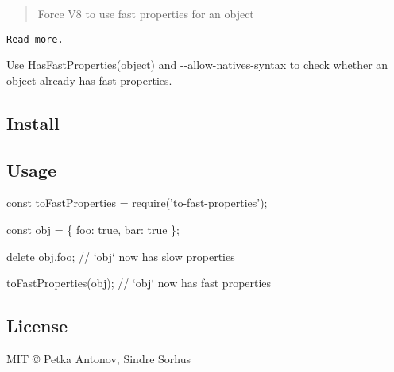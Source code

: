 \begin{quote}
Force V8 to use fast properties for an object \end{quote}


\href{http://stackoverflow.com/questions/24987896/}{\tt Read more.}

Use {\ttfamily Has\+Fast\+Properties(object)} and {\ttfamily -\/-\/allow-\/natives-\/syntax} to check whether an object already has fast properties.

\subsection*{Install}




\subsection*{Usage}


\begin{DoxyCode}
const toFastProperties = require('to-fast-properties');

const obj = \{
    foo: true,
    bar: true
\};

delete obj.foo;
// `obj` now has slow properties

toFastProperties(obj);
// `obj` now has fast properties
\end{DoxyCode}


\subsection*{License}

M\+IT © Petka Antonov, Sindre Sorhus 